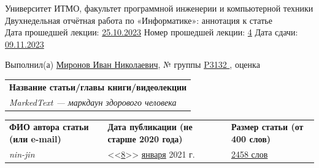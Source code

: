 \documentclass[12pt]{article}
\begin{document}
\begin{center}
\quad Университет ИТМО, факультет программной инженерии и компьютерной техники \\
\quad Двухнедельная отчётная работа по «Информатике»: аннотация к статье\\
\quad Дата прошедшей лекции: \underline{25.10.2023} 	Номер прошедшей лекции: \underline{4}	Дата сдачи: \underline{09.11.2023}

\bigskip

\quad Выполнил(а) \underline{Миронов Иван Николаевич}, № группы \underline{ P3132 }, оценка \underline{\hspace{2cm}}


\end{center}

\begin{tabularx}{\textwidth} { 
  | >{\raggedright\arraybackslash}X|}
    \hline
\textbf{Название статьи/главы книги/видеолекции}\\
    \textit{MarkedText — маркдаун здорового человека}\\
    \hline
\end{tabularx}

\begin{tabularx}{\textwidth} 
{ 
| >{\centering\arraybackslash}X
| >{\centering\arraybackslash}X
| >{\centering\arraybackslash}X 
|}
    \textbf{ФИО автора статьи \quad (или e-mail)} & \textbf{Дата публикации \qquad\qquad (не старше 2020 года)} & \textbf{Размер статьи \qquad\qquad (от 400 слов)} \\
     \textit{nin-jin} & <<\underline{8}>> \underline{января} 2021 г. & \underline{2458 слов} \\
    \hline
\end{tabularx}
\end{document}
